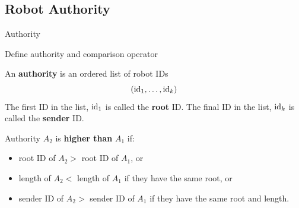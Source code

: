 \subsection{Robot Authority}
\begin{frame}{Authority}
  \begin{block}{Define authority and comparison operator}
      \begin{definition}
      \small{An \textbf{authority} is an ordered list of robot IDs
        $$({\rm id}_1, \ldots, {\rm id}_k)$$
        The first ID in the list, ${\rm id}_1$ is called the \textbf{root} ID.
        The final ID in the list, ${\rm id}_k$ is called the \textbf{sender} ID.}
    \end{definition}
    \begin{definition}
      \small{Authority $A_2$ is \textbf{higher than} $A_1$ if:}
      \begin{itemize}
      \item \small{root ID of $A_2 >$ root ID of $A_1$, or}
      \item \small{length of $A_2 <$  length of $A_1$ if they have the same root, or}
      \item \small{sender ID of $A_2 >$ sender ID of $A_1$ if they have the same root and length.}
      \end{itemize}
    \end{definition}
  \end{block}
\end{frame}



